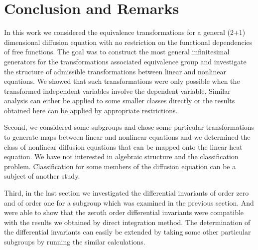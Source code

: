 \documentclass[a4paper]{article}
\begin{document}
  \section{Conclusion and Remarks}
  In this work we considered the equivalence transformations for a general (2+1) dimensional diffusion equation with no restriction on the functional dependencies of  free functions. The goal was to construct the most general infinitesimal generators for the transformations associated  equivalence group and investigate the structure of admissible transformations between linear and nonlinear equations. We showed that such transformations were only possible when the transformed independent variables involve  the dependent variable. Similar analysis can either be applied to some smaller classes directly or the results obtained here can be applied by appropriate restrictions.

  Second, we considered some subgroups and chose some particular transformations to generate maps between linear and nonlinear equations and we determined the class of nonlinear diffusion equations that can be mapped onto the linear heat equation. We have not interested in algebraic structure and the classification problem. Classification for some members of the diffusion equation can be a subject of another study.

  Third, in the last section we investigated the  differential invariants of order zero and of order one for a subgroup which was examined in the previous section. And were able to show that the zeroth order differential invariants were compatible with the results we obtained by direct integration method.  The determination of the differential invariants can easily be extended by taking some other particular subgroups by running the similar calculations.


    
  {}

  
\end{document}
